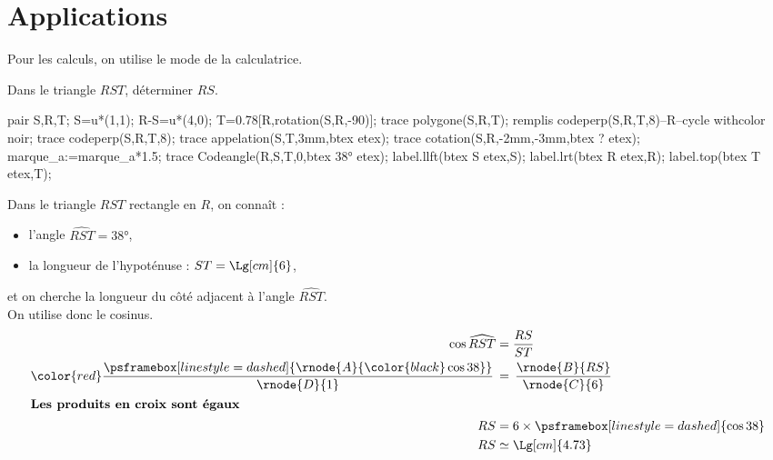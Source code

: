 \section{Applications}
\begin{remarque}
    Pour les calculs, on utilise le mode \fg{} de la calculatrice.
\end{remarque}

\begin{methode}
    \exercice    
    Dans le triangle $RST$, déterminer $RS$.\\
    \begin{Geometrie}[CoinHD={(6u,4.5u)}]        
        pair S,R,T;
        S=u*(1,1);
        R-S=u*(4,0);
        T=0.78[R,rotation(S,R,-90)];
        trace polygone(S,R,T);
        remplis codeperp(S,R,T,8)--R--cycle withcolor noir;
        trace codeperp(S,R,T,8);
        trace appelation(S,T,3mm,btex  etex);        
        trace cotation(S,R,-2mm,-3mm,btex ? etex);
        marque_a:=marque_a*1.5;
        trace Codeangle(R,S,T,0,btex \ang{38} etex);
        label.llft(btex S etex,S);
        label.lrt(btex R etex,R);
        label.top(btex T etex,T);
    \end{Geometrie}
    \correction
    Dans le triangle $RST$ rectangle en $R$, on connaît :
    \begin{itemize}
        \item l'angle $\widehat{RST}=\ang{38}$,
        \item la longueur de l'hypoténuse : $ST=\Lg[cm]{6}$,
    \end{itemize}
    et on cherche la longueur du côté adjacent à l'angle $\widehat{RST}$.\\
    On utilise donc le cosinus.
    \begin{align*}
        \cos\widehat{RST}&=\frac{RS}{ST}\\
        {\color{red}\frac{\psframebox[linestyle=dashed]{\rnode{A}{\color{black}\cos38}}}{\rnode{D}{1}}}\,&=\,\frac{\rnode{B}{RS}}{\rnode{C}{6}}\\    
        \intertext{\centering\bf Les produits en croix sont égaux}
        RS&=6\times\psframebox[linestyle=dashed]{\cos38}\\
        RS&\simeq\Lg[cm]{4.73}
    \end{align*}
\end{methode}


